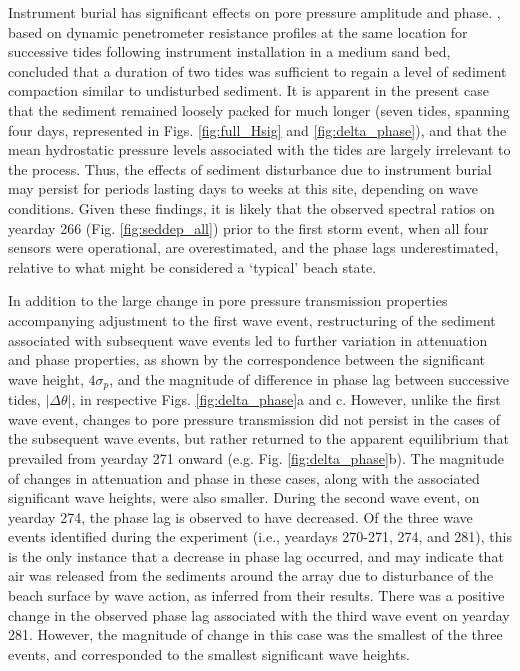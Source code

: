 Instrument burial has significant effects on pore pressure amplitude and phase. \citet{Bonjean_etal2004}, based on dynamic penetrometer resistance profiles at the same location for successive tides following instrument installation in a medium sand bed, concluded that a duration of two tides was sufficient to regain a level of sediment compaction similar to undisturbed sediment. It is apparent in the present case that the sediment remained loosely packed for much longer (seven tides, spanning four days, represented in Figs. \ref{fig:full_Hsig} and \ref{fig:delta_phase}), and that the mean hydrostatic pressure levels associated with the tides are largely irrelevant to the process. Thus, the effects of sediment disturbance due to instrument burial may persist for periods lasting days to weeks at this site, depending on wave conditions. Given these findings, it is likely that the observed spectral ratios on yearday 266 (Fig. \ref{fig:seddep_all}) prior to the first storm event, when all four sensors were operational, are overestimated, and the phase lags underestimated, relative to what might be considered a `typical' beach state.

In addition to the large change in pore pressure transmission properties accompanying adjustment to the first wave event, restructuring of the sediment associated with subsequent wave events led to further variation in attenuation and phase properties, as shown by the correspondence between the significant wave height, $4\sigma_{p}$, and the magnitude of difference in phase lag between successive tides, $|\Delta\theta|$, in respective Figs. \ref{fig:delta_phase}a and c. However, unlike the first wave event, changes to pore pressure transmission did not persist in the cases of the subsequent wave events, but rather returned to the apparent equilibrium that prevailed from yearday 271 onward (e.g. Fig. \ref{fig:delta_phase}b). The magnitude of changes in attenuation and phase in these cases, along with the associated significant wave heights, were also smaller. During the second wave event, on yearday 274, the phase lag is observed to have decreased. Of the three wave events identified during the experiment (i.e., yeardays 270-271, 274, and 281), this is the only instance that a decrease in phase lag occurred, and may indicate that air was released from the sediments around the array due to disturbance of the beach surface by wave action, as \citet{Michallet_etal2009} inferred from their results. There was a positive change in the observed phase lag associated with the third wave event on yearday 281. However, the magnitude of change in this case was the smallest of the three events, and corresponded to the smallest significant wave heights.

